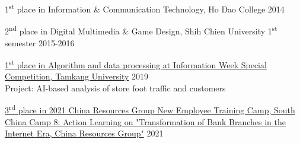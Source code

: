  





1\textsuperscript{st} place in Information \& Communication Technology, Ho Dao College \hfill 2014

2\textsuperscript{nd} place in Digital Multimedia \& Game Design, Shih Chien University \hfill  1\textsuperscript{st} semester 2015-2016

\href{http://aiit.csie.tku.edu.tw/reward/inside/2019ITShow/9.html}{1\textsuperscript{st} place in Algorithm and data processing at Information Week Special Competition, Tamkang University} \hfill  2019\\
Project: AI-based analysis of store foot traffic and customers

\href{https://mp.weixin.qq.com/s/45NlbMGvLXlcKZxvWkTHOw}{3\textsuperscript{rd} place in 2021 China Resources Group New Employee Training Camp, South China Camp 8: Action Learning on "Transformation of Bank Branches in the Internet Era, China Resources Group"} \hfill  2021


